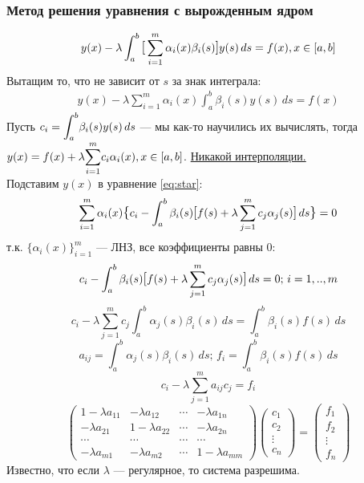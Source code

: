 \subsubsection{Метод решения уравнения с вырожденным ядром}
\[y(x) -  \lambda\int_{a}^{b} \mathlarger{[}\sum_{i=1}^{m}\alpha_{i}(x)\beta_{i}(s)\mathlarger{]}y(s) \,ds  = f(x),\space x\in[a,b] \] 
Вытащим то, что не зависит от $s$ за знак интеграла:
\begin{align}
y(x) -  \lambda\sum_{i=1}^{m}\alpha_{i}(x)\int_{a}^{b} \beta_{i}(s)y(s) \,ds  = f(x) \tag{$\star$} \label{eq:star}
\end{align}
Пусть \(c_i=\mathlarger{\int}_a^b \beta_i(s)y(s)\,ds\) --- мы как-то научились их вычислять, тогда\\ \(y(x)=f(x) +\lambda \mathlarger{\sum}_{i=1}^mc_i\alpha_i(x),\space x\in[a,b]\). \underline{Никакой интерполяции.}\\
Подставим $y(x)$ в уравнение \eqref{eq:star}:
\[\sum_{i=1}^m\alpha_i(x)\mathlarger{\{} c_i-\int_a^b \beta_i(s)\mathlarger{[} f(s) + \lambda \sum_{j=1}^m c_j\alpha_j(s)\mathlarger{]}\,ds \mathlarger{\}} =0\]
т.к. $\{\alpha_i(x)\}_{i=1}^m$ --- ЛНЗ, все коэффициенты равны 0:
\[c_i-\int_a^b\beta_i(s)\mathlarger{[}f(s)+\lambda\sum_{j=1}^mc_j\alpha_j(s)\mathlarger{]}\, ds=0;\, i=1,..,m \]
\[c_i-\lambda\sum_{j=1}^m c_j\int_a^b \alpha_j(s)\beta_i(s)\,ds=\int_a^b\beta_i(s)f(s)\,ds\]
\[ a_{ij}=\int_a^b\alpha_j(s)\beta_i(s)\,ds;\, f_i=\int_a^b\beta_i(s)f(s)\,ds\]
\[c_i-\lambda\sum_{j=1}^ma_{ij}c_j=f_i\]
\[
\begin{pmatrix}
    1-\lambda a_{11} & -\lambda a_{12} & \cdots & -\lambda a_{1n}\\
    -\lambda a_{21} & 1-\lambda a_{22} & \cdots & -\lambda a_{2n}\\
    \cdots & \cdots & \cdots & \cdots\\
    -\lambda a_{m1} & -\lambda a_{m2} & \cdots & 1-\lambda a_{mm}
\end{pmatrix}
\begin{pmatrix}
    c_1\\c_2\\ \vdots \\ c_n
\end{pmatrix}
=
\begin{pmatrix}
    f_1\\ f_2 \\ \vdots \\f_n
\end{pmatrix}
\]
Известно, что если $\lambda$ --- регулярное, то система разрешима.\\
